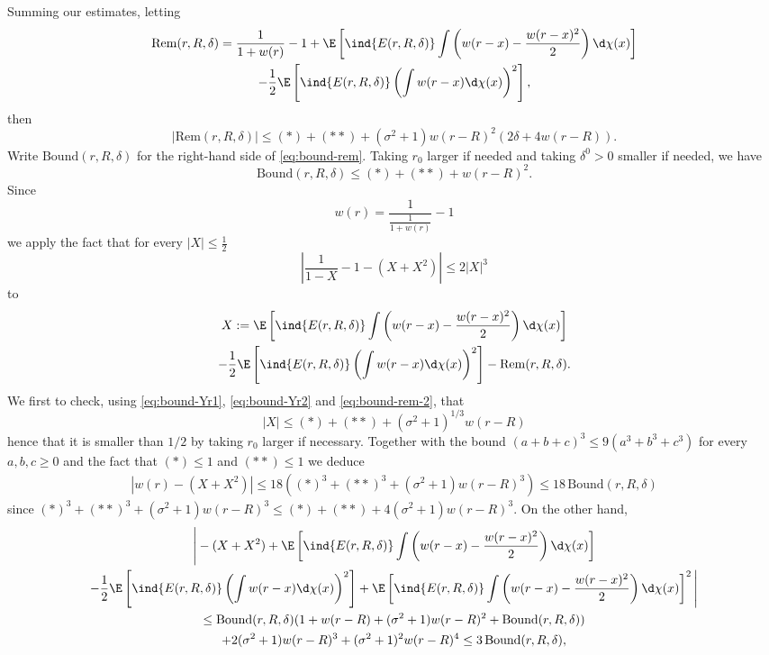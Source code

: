 \documentclass[10pt,a4paper]{article}
\begin{document}
Summing our estimates, letting 
\begin{multline}\label{eq:expansion-1-over-1-plus-w(r)}
\mathrm{Rem}(r,R,\delta) =  \frac{1}{1+w(r)} - 1 + \E\left[ \ind{E(r,R,\delta)} \int \left( w(r-x) - \frac{w(r-x)^2}{2} \right) \d\chi(x) \right] \\
- \frac{1}{2} \E\left[\ind{E(r,R,\delta)} \left(\int w(r-x) \d\chi(x) \right)^2\right] , 
\end{multline}
then 
\begin{equation}\label{eq:bound-rem}
|\mathrm{Rem}(r,R,\delta)| \leq (*) + (**) + (\sigma^2 + 1) w(r-R)^2 \left( 2\delta + 4w(r-R) \right) .
\end{equation}
Write $\mathrm{Bound}(r,R,\delta)$ for the right-hand side of \eqref{eq:bound-rem}. 
Taking $r_0$ larger if needed and taking $\delta^0>0$ smaller if needed, we have  
\begin{equation}\label{eq:bound-rem-2}
\mathrm{Bound}(r,R,\delta) \leq (*) + (**) + w(r-R)^2 .
\end{equation} 
Since 
\[ w(r) = \frac{1}{\frac{1}{1+w(r)}} -1 \]
we apply the fact that for every $|X|\leq \frac 12$
\[ \left|\frac{1}{1-X} - 1 - (X+X^2) \right| \leq 2 |X|^3 \]
to
\begin{multline*}
X := \E\left[ \ind{E(r,R,\delta)} \int \left( w(r-x) - \frac{w(r-x)^2}{2} \right) \d\chi(x) \right] \\
 - \frac{1}{2} \E\left[\ind{E(r,R,\delta)} \left(\int w(r-x) \d\chi(x) \right)^2\right] - \mathrm{Rem}(r,R,\delta) .
\end{multline*}
We first to check, using \eqref{eq:bound-Yr1}, \eqref{eq:bound-Yr2} and \eqref{eq:bound-rem-2}, that 
\[ |X| \leq (*) + (**) + (\sigma^2+1)^{1/3} w(r-R) \] 
hence that it is smaller than $1/2$ by taking $r_0$ larger if necessary. Together with the bound $(a+b+c)^3 \leq 9 (a^3 + b^3 + c^3)$ for every $a,b,c\geq 0$ and the fact that $(*)\leq 1$ and $(**)\leq 1$ we deduce 
\begin{align*}
\left| w(r) - (X + X^2) \right| \leq 18((*)^3 + (**)^3 + (\sigma^2+1) w(r-R)^3) \leq 18 \, \mathrm{Bound}(r,R,\delta) 
\end{align*}
since $(*)^3 + (**)^3 + (\sigma^2+1)w(r-R)^3 \leq (*) + (**) + 4(\sigma^2+1)w(r-R)^3$. 
On the other hand, 
\begin{multline*}
\Bigg| -(X + X^2) + \E\left[ \ind{E(r,R,\delta)} \int \left( w(r-x) - \frac{w(r-x)^2}{2} \right) \d\chi(x) \right] \\
- \frac{1}{2} \E\left[\ind{E(r,R,\delta)} \left(\int w(r-x) \d\chi(x) \right)^2\right] + \E\left[ \ind{E(r,R,\delta)} \int \left( w(r-x) - \frac{w(r-x)^2}{2} \right) \d\chi(x) \right]^2 \Bigg| \\
\leq \mathrm{Bound}(r,R,\delta)(1+w(r-R)+(\sigma^2+1)w(r-R)^2 + \mathrm{Bound}(r,R,\delta)) \\
+ 2 (\sigma^2+1) w(r-R)^3 + (\sigma^2+1)^2 w(r-R)^4 
\leq 3 \, \mathrm{Bound}(r,R,\delta) ,
\end{multline*}
\end{document}
